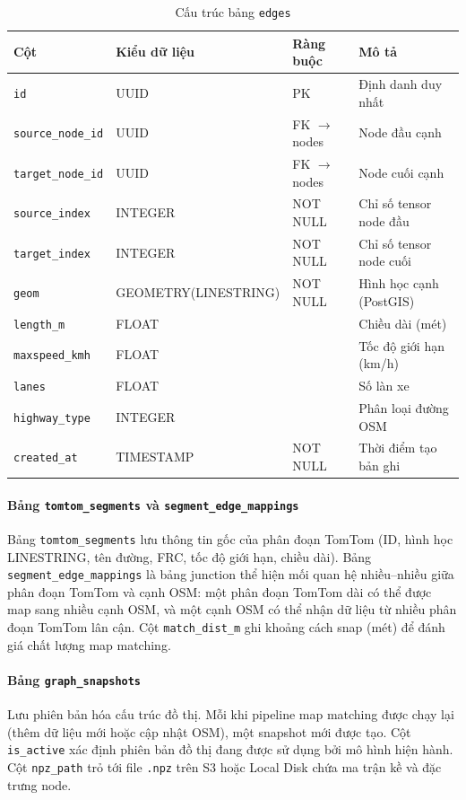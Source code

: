 \begin{table}[H]
\centering
\caption{Cấu trúc bảng \texttt{edges}}
\begin{tabular}{|l|l|l|p{5cm}|}
\hline
\textbf{Cột} & \textbf{Kiểu dữ liệu} & \textbf{Ràng buộc} & \textbf{Mô tả} \\
\hline
\texttt{id} & UUID & PK & Định danh duy nhất \\
\texttt{source\_node\_id} & UUID & FK $\to$ nodes & Node đầu cạnh \\
\texttt{target\_node\_id} & UUID & FK $\to$ nodes & Node cuối cạnh \\
\texttt{source\_index} & INTEGER & NOT NULL & Chỉ số tensor node đầu \\
\texttt{target\_index} & INTEGER & NOT NULL & Chỉ số tensor node cuối \\
\texttt{geom} & GEOMETRY(LINESTRING) & NOT NULL & Hình học cạnh (PostGIS) \\
\texttt{length\_m} & FLOAT & & Chiều dài (mét) \\
\texttt{maxspeed\_kmh} & FLOAT & & Tốc độ giới hạn (km/h) \\
\texttt{lanes} & FLOAT & & Số làn xe \\
\texttt{highway\_type} & INTEGER & & Phân loại đường OSM \\
\texttt{created\_at} & TIMESTAMP & NOT NULL & Thời điểm tạo bản ghi \\
\hline
\end{tabular}
\end{table}

\paragraph{Bảng \texttt{tomtom\_segments} và \texttt{segment\_edge\_mappings}}
Bảng \texttt{tomtom\_segments} lưu thông tin gốc của phân đoạn TomTom (ID, hình học LINESTRING, tên đường, FRC, tốc độ giới hạn, chiều dài). Bảng \texttt{segment\_edge\_mappings} là bảng junction thể hiện mối quan hệ nhiều--nhiều giữa phân đoạn TomTom và cạnh OSM: một phân đoạn TomTom dài có thể được map sang nhiều cạnh OSM, và một cạnh OSM có thể nhận dữ liệu từ nhiều phân đoạn TomTom lân cận. Cột \texttt{match\_dist\_m} ghi khoảng cách snap (mét) để đánh giá chất lượng map matching.

\paragraph{Bảng \texttt{graph\_snapshots}}
Lưu phiên bản hóa cấu trúc đồ thị. Mỗi khi pipeline map matching được chạy lại (thêm dữ liệu mới hoặc cập nhật OSM), một snapshot mới được tạo. Cột \texttt{is\_active} xác định phiên bản đồ thị đang được sử dụng bởi mô hình hiện hành. Cột \texttt{npz\_path} trỏ tới file \texttt{.npz} trên S3 hoặc Local Disk chứa ma trận kề và đặc trưng node.

